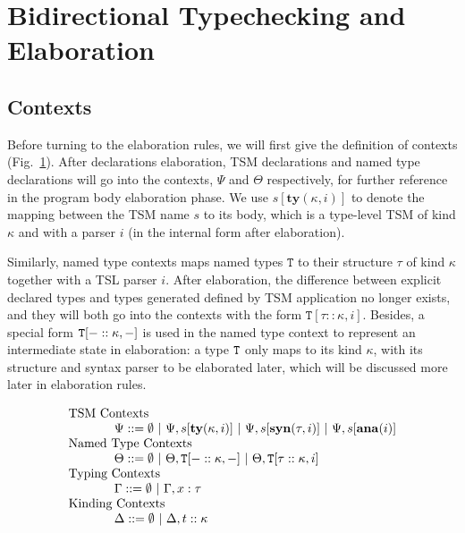 \section{Bidirectional Typechecking and Elaboration}
\label{tr-semantics}

\subsection{Contexts}
Before turning to the elaboration rules, we will first give the definition of contexts (Fig.~\ref{typechecking-environment}). After declarations elaboration, TSM declarations and named type declarations will go into the contexts, $\Psi$ and $\Theta$ respectively, for further reference in the program body elaboration phase. We use $s[\mathbf{ty}(\kappa,i)]$ to denote the mapping between the TSM name $s$ to its body, which is a type-level TSM of kind $\kappa$ and with a parser $i$ (in the internal form after elaboration).

Similarly, named type contexts maps named types $\mathtt{T}$ to their structure $\tau$ of kind $\kappa$ together with a TSL parser $i$. After elaboration, the difference between explicit declared types and types generated defined by TSM application no longer exists, and they will both go into the contexts with the form $\mathtt{T}[\tau :: \kappa,i]$. Besides, a special form $\mathtt{T}[-::\kappa,-]$ is used in the named type context to represent an intermediate state in elaboration: a type $\mathtt{T}$ only maps to its kind $\kappa$, with its structure and syntax parser to be elaborated later, which will be discussed more later in elaboration rules.

\begin{figure}[ht]
\[
\begin{array}{l}
      \text{TSM Contexts}\\
      ~~~~~~~~~~~\Psi ::= \emptyset ~|~ \Psi, s[\mathbf{ty}(\kappa, i)] ~|~ \Psi, s[\mathbf{syn}(\tau,i)] ~|~ \Psi, s[\mathbf{ana}(i)]\\
      \text{Named Type Contexts}\\
      ~~~~~~~~~~~\Theta ::= \emptyset~|~ \Theta, \mathtt{T}[-::\kappa,-] ~|~ \Theta, \mathtt{T}[\tau :: \kappa,i]\\
      \text{Typing Contexts}\\
      ~~~~~~~~~~~\Gamma ::= \emptyset ~|~ \Gamma, x : \tau\\
      \text{Kinding Contexts}\\
      ~~~~~~~~~~~\Delta ::= \emptyset ~|~ \Delta,t::\kappa
\end{array}
\]
\label{typechecking-environment}
\end{figure}


